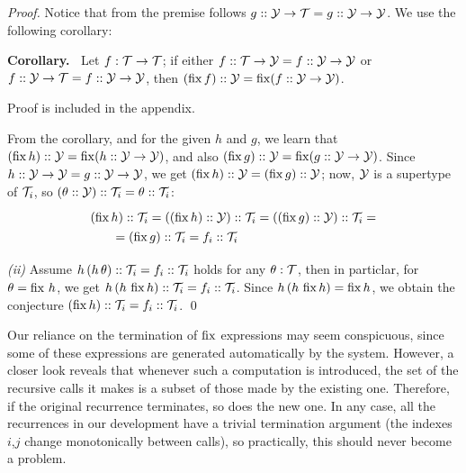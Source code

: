 \begin{proof}
Notice that from the premise follows $g :: \mathcal{Y}\to\mathcal{T} = g :: \mathcal{Y}\to\mathcal{Y}$. We use the following corollary:

\medskip\noindent
{\bf Corollary.~} Let $f : \mathcal{T}\to\mathcal{T}$; if either $f :: \mathcal{T}\to\mathcal{Y} = f :: \mathcal{Y}\to\mathcal{Y}$ or $f :: \mathcal{Y}\to\mathcal{T} = f :: \mathcal{Y}\to\mathcal{Y}$, 
then $(\operatorname{fix} f)::\mathcal{Y} = \operatorname{fix} (f :: \mathcal{Y}\to\mathcal{Y})$.

Proof is included in the appendix.

\medskip
From the corollary, and for the given $h$ and $g$, we learn that $(\operatorname{fix} h)::\mathcal{Y} = \operatorname{fix}(h::\mathcal{Y}\to\mathcal{Y})$,
and also $(\operatorname{fix} g)::\mathcal{Y}=\operatorname{fix}(g::\mathcal{Y}\to\mathcal{Y})$. Since $h::\mathcal{Y}\to\mathcal{Y}=g::\mathcal{Y}\to\mathcal{Y}$,
we get $(\operatorname{fix} h)::\mathcal{Y} = (\operatorname{fix} g)::\mathcal{Y}$; now, $\mathcal{Y}$ is a supertype of $\mathcal{T}_i$, so $(\theta::\mathcal{Y})::\mathcal{T}_i=\theta::\mathcal{T}_i$:
\[\renewcommand\arraystretch{1.3}
  \begin{array}{l}(\fix h)::\T_i = ((\fix h)::\Y)::\T_i = ((\fix g)::\Y)::\T_i = \\
    \qquad = (\fix g)::\T_i=f_i::\T_i
  \end{array}\]

{\it (ii)} Assume $h\,(h\,\theta) :: \mathcal{T}_i = f_i :: \mathcal{T}_i$ holds for any $\theta:\mathcal{T}$,
then in particlar, for $\theta=\operatorname{fix}\,h$, we get $h\,(h\,\operatorname{fix} h) :: \mathcal{T}_i = f_i :: \mathcal{T}_i$.
Since $h\,(h\,\operatorname{fix} h) = \operatorname{fix} h$, we obtain the conjecture $(\operatorname{fix} h) :: \mathcal{T}_i = f_i :: \mathcal{T}_i$.
\qed
\end{proof}

\medskip
Our reliance on the termination of $\operatorname{fix}$ expressions may seem conspicuous, since some of these
expressions are generated automatically by the system. However, a closer look reveals that whenever
such a computation is introduced, the set of the recursive calls it makes is a subset of those made by the existing one.
Therefore, if the original recurrence terminates, so does the new one. In any case, all the recurrences
in our development have a trivial termination argument (the indexes $i$,$j$ change monotonically between calls),
so practically, this should never become a problem.

